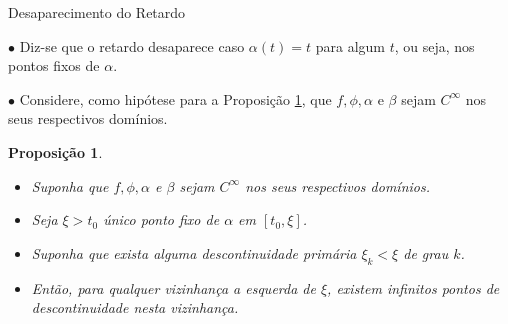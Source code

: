 \documentclass{beamer}
\theoremstyle{plain}
\newtheorem{prop}{Proposição}
\theoremstyle{definition}
\begin{document}
\begin{frame}{Desaparecimento do Retardo}

   \small

    $\bullet$ Diz-se que o retardo desaparece caso $\alpha(t) = t$ para algum $t$, ou seja, nos pontos fixos de $\alpha$.


    $\bullet$ Considere, como hipótese para a Proposição \ref{chap2:prop:1}, que $f, \phi, \alpha$ e $\beta$ sejam $C^\infty$ nos seus respectivos domínios.


    \begin{prop}
        \label{chap2:prop:1}
        \begin{itemize}
            \item[$\bullet$] Suponha que $f, \phi, \alpha$ e $\beta$ sejam $C^\infty$ nos seus respectivos domínios.
            \item[$\bullet$] Seja $\xi > t_0$ único ponto fixo de $\alpha$ em $[t_0, \xi]$.
            \item[$\bullet$] Suponha que exista alguma descontinuidade primária $\xi_k < \xi$ de grau $k$.
            \item Então, para qualquer vizinhança a esquerda de $\xi$, existem infinitos pontos de descontinuidade nesta vizinhança.
        \end{itemize}



    \end{prop}




\end{frame}

\end{document}
